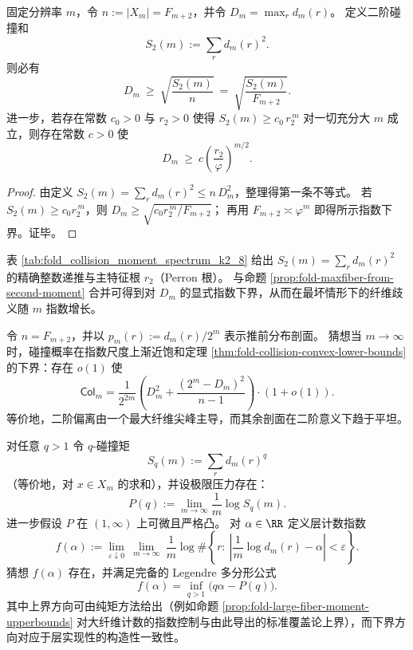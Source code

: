 \begin{proposition}[碰撞二阶矩导出的最大纤维下界]\label{prop:fold-maxfiber-from-second-moment}
固定分辨率 \(m\)，令 \(n:=|X_m|=F_{m+2}\)，并令 \(D_m=\max_r d_m(r)\)。
定义二阶碰撞和
\[
S_2(m):=\sum_{r} d_m(r)^2.
\]
则必有
\[
D_m\ \ge\ \sqrt{\frac{S_2(m)}{n}}
\ =\ \sqrt{\frac{S_2(m)}{F_{m+2}}}.
\]
进一步，若存在常数 \(c_0>0\) 与 \(r_2>0\) 使得 \(S_2(m)\ge c_0\,r_2^{\,m}\) 对一切充分大 \(m\) 成立，则存在常数 \(c>0\) 使
\[
D_m\ \ge\ c\left(\frac{r_2}{\varphi}\right)^{m/2}.
\]
\end{proposition}

\begin{proof}
由定义 \(S_2(m)=\sum_r d_m(r)^2\le n\,D_m^2\)，整理得第一条不等式。
若 \(S_2(m)\ge c_0 r_2^{\,m}\)，则
\(
D_m\ge \sqrt{c_0 r_2^{\,m}/F_{m+2}}
\)；
再用 \(F_{m+2}\asymp \varphi^{m}\) 即得所示指数下界。证毕。
\end{proof}

\begin{remark}\label{rem:fold-maxfiber-from-s2-perron-root}
表 \ref{tab:fold_collision_moment_spectrum_k2_8} 给出 \(S_2(m)=\sum_r d_m(r)^2\) 的精确整数递推与主特征根 \(r_2\)（Perron 根）。
与命题 \ref{prop:fold-maxfiber-from-second-moment} 合并可得到对 \(D_m\) 的显式指数下界，从而在最坏情形下的纤维歧义随 \(m\) 指数增长。
\end{remark}

\begin{conjecture}\label{conj:fold-col-spike-flat-saturation}
令 \(n=F_{m+2}\)，并以 \(p_m(r):=d_m(r)/2^m\) 表示推前分布剖面。
猜想当 \(m\to\infty\) 时，碰撞概率在指数尺度上渐近饱和定理 \ref{thm:fold-collision-convex-lower-bounds} 的下界：存在 \(o(1)\) 使
\[
\mathsf{Col}_m
=\frac{1}{2^{2m}}\left(D_m^2+\frac{(2^m-D_m)^2}{n-1}\right)\cdot(1+o(1)).
\]
等价地，二阶偏离由一个最大纤维尖峰主导，而其余剖面在二阶意义下趋于平坦。
\end{conjecture}

\begin{conjecture}\label{conj:fold-multifractal-legendre-completeness}
对任意 \(q>1\) 令 \(q\)-碰撞矩
\[
S_q(m):=\sum_{r} d_m(r)^q
\]
（等价地，对 \(x\in X_m\) 的求和），并设极限压力存在：
\[
P(q):=\lim_{m\to\infty}\frac{1}{m}\log S_q(m).
\]
进一步假设 \(P\) 在 \((1,\infty)\) 上可微且严格凸。
对 \(\alpha\in\RR\) 定义层计数指数
\[
f(\alpha):=\lim_{\varepsilon\downarrow 0}\ \lim_{m\to\infty}\ \frac{1}{m}\log
\#\left\{r:\ \left|\frac{1}{m}\log d_m(r)-\alpha\right|<\varepsilon\right\}.
\]
猜想 \(f(\alpha)\) 存在，并满足完备的 Legendre 多分形公式
\[
\boxed{\;
f(\alpha)=\inf_{q>1}\bigl(q\alpha-P(q)\bigr). \;}
\]
其中上界方向可由纯矩方法给出（例如命题 \ref{prop:fold-large-fiber-moment-upperbounds} 对大纤维计数的指数控制与由此导出的标准覆盖论上界），而下界方向对应于层实现性的构造性一致性。
\end{conjecture}

\endinput
